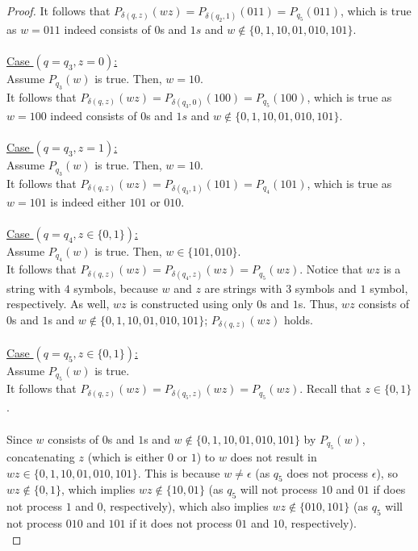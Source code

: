 \documentclass[12pt]{article}
\begin{document}
\begin{proof}
    It follows that $P_{\delta(q, z)}(wz) = P_{\delta(q_2, 1)}(011) = P_{q_5}(011)$, which is true as $w = 011$ indeed consists of $0$s and $1s$ and $w \notin \{0, 1, 10, 01, 010, 101\}$. \\
    \\
    \underline{Case $(q = q_3, z = 0)$:} \\
    Assume $P_{q_3}(w)$ is true. Then, $w = 10$. \\
    It follows that $P_{\delta(q, z)}(wz) = P_{\delta(q_3, 0)}(100) = P_{q_5}(100)$, which is true as $w = 100$ indeed consists of $0$s and $1s$ and $w \notin \{0, 1, 10, 01, 010, 101\}$. \\
    \\
    \underline{Case $(q = q_3, z = 1)$:} \\
    Assume $P_{q_3}(w)$ is true. Then, $w = 10$. \\
    It follows that $P_{\delta(q, z)}(wz) = P_{\delta(q_3, 1)}(101) = P_{q_4}(101)$, which is true as $w = 101$ is indeed either $101$ or $010$. \\
    \\
    \underline{Case $(q = q_4, z \in \{0, 1\})$:} \\
    Assume $P_{q_4}(w)$ is true. Then, $w \in \{101, 010\}$. \\
    It follows that $P_{\delta(q, z)}(wz) = P_{\delta(q_4, z)}(wz) = P_{q_5}(wz)$. Notice that $wz$ is a string with $4$ symbols, because $w$ and $z$ are strings with $3$ symbols and $1$ symbol, respectively. As well, $wz$ is constructed using only $0$s and $1$s. Thus, $wz$ consists of $0$s and $1$s and $w \notin \{0, 1, 10, 01, 010, 101\}$; $P_{\delta(q, z)}(wz)$ holds. \\
    \\
    \underline{Case $(q = q_5, z \in \{0, 1\})$:} \\
    Assume $P_{q_5}(w)$ is true. \\
    It follows that $P_{\delta(q, z)}(wz) = P_{\delta(q_5, z)}(wz) = P_{q_5}(wz)$. Recall that $z \in \{0, 1\}$. \\
    \\
    Since $w$ consists of $0$s and $1$s and $w \notin \{0, 1, 10, 01, 010, 101\}$ by $P_{q_5}(w)$, concatenating $z$ (which is either $0$ or $1$) to $w$ does not result in $wz \in \{0, 1, 10, 01, 010, 101\}$. This is because $w \neq \epsilon$ (as $q_5$ does not process $\epsilon$), so $wz \notin \{0, 1\}$, which implies $wz \notin \{10, 01\}$ (as $q_5$ will not process $10$ and $01$ if does not process $1$ and $0$, respectively), which also implies $wz \notin \{010, 101\}$ (as $q_5$ will not process $010$ and $101$ if it does not process $01$ and $10$, respectively). \\

\end{proof}
\end{document}
